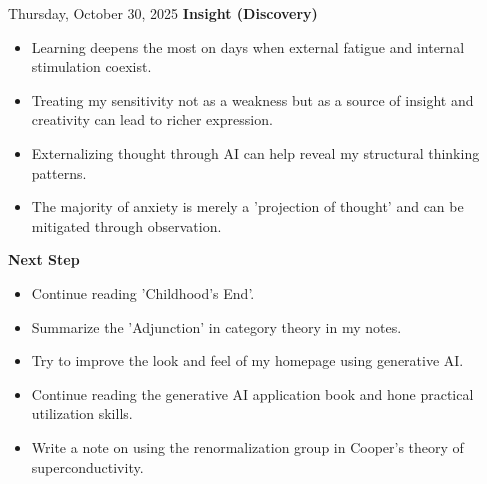 \documentclass[dvipdfmx, autodetect-engine, aspectratio=169, 10.5pt]{beamer}
\begin{document}
\begin{frame}{Thursday, October 30, 2025}
	\textbf{Insight (Discovery)}
	\begin{itemize}
		\item Learning deepens the most on days when external fatigue and internal stimulation coexist.
		\item Treating my sensitivity not as a weakness but as a source of insight and creativity can lead to richer expression.
		\item Externalizing thought through AI can help reveal my structural thinking patterns.
		\item The majority of anxiety is merely a 'projection of thought' and can be mitigated through observation.
	\end{itemize}

	\textbf{Next Step}
	\begin{itemize}
		\item Continue reading 'Childhood's End'.
		\item Summarize the 'Adjunction' in category theory in my notes.
		\item Try to improve the look and feel of my homepage using generative AI.
		\item Continue reading the generative AI application book and hone practical utilization skills.
		\item Write a note on using the renormalization group in Cooper's theory of superconductivity.
	\end{itemize}
\end{frame}
\end{document}
